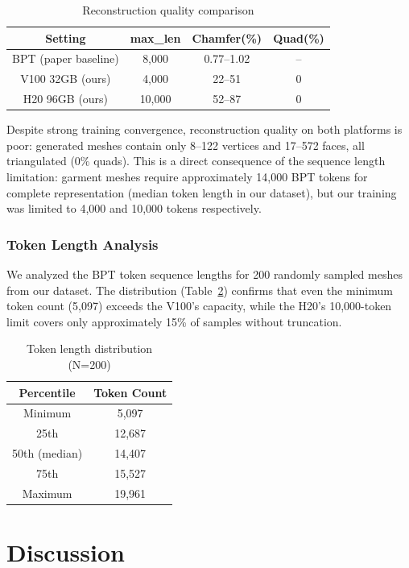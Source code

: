 \documentclass[conference]{IEEEtran}
\begin{document}
\begin{table}[h]
\centering
\caption{Reconstruction quality comparison}
\label{tab:results}
\begin{tabular}{cccc}
\toprule
Setting & max\_len & Chamfer(\%) & Quad(\%) \\
\midrule
BPT (paper baseline) & 8,000 & 0.77--1.02 & -- \\
V100 32GB (ours) & 4,000 & 22--51 & 0 \\
H20 96GB (ours) & 10,000 & 52--87 & 0 \\
\bottomrule
\end{tabular}
\end{table}

Despite strong training convergence, reconstruction quality on both platforms is poor: generated meshes contain only 8--122 vertices and 17--572 faces, all triangulated (0\% quads).
This is a direct consequence of the sequence length limitation: garment meshes require approximately 14,000 BPT tokens for complete representation (median token length in our dataset), but our training was limited to 4,000 and 10,000 tokens respectively.

\subsubsection{Token Length Analysis}

We analyzed the BPT token sequence lengths for 200 randomly sampled meshes from our dataset.
The distribution (Table~\ref{tab:tokens}) confirms that even the minimum token count (5,097) exceeds the V100's capacity, while the H20's 10,000-token limit covers only approximately 15\% of samples without truncation.

\begin{table}[h]
\centering
\caption{Token length distribution (N=200)}
\label{tab:tokens}
\begin{tabular}{cc}
\toprule
Percentile & Token Count \\
\midrule
Minimum & 5,097 \\
25th    & 12,687 \\
50th (median) & 14,407 \\
75th    & 15,527 \\
Maximum & 19,961 \\
\bottomrule
\end{tabular}
\end{table}

\section{Discussion}
\end{document}
